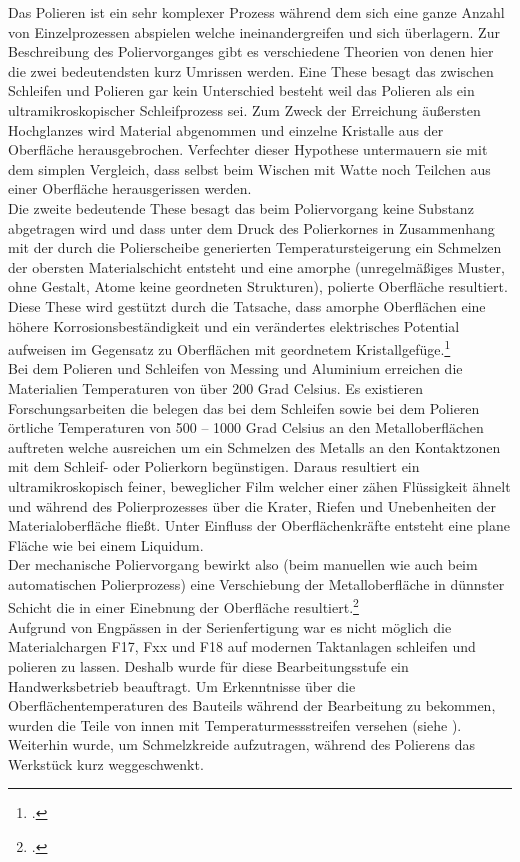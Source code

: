 \documentclass[12pt,a4paper,parskip]{scrartcl}
\begin{document}
Das Polieren ist ein sehr komplexer Prozess während dem sich eine ganze Anzahl von Einzelprozessen abspielen welche ineinandergreifen und sich überlagern. Zur Beschreibung des Poliervorganges gibt es verschiedene Theorien von denen hier die zwei bedeutendsten kurz Umrissen werden. Eine These besagt das zwischen Schleifen und Polieren gar kein Unterschied besteht weil  das Polieren als ein ultramikroskopischer Schleifprozess sei. Zum Zweck der Erreichung  äußersten Hochglanzes wird Material abgenommen und einzelne Kristalle aus der Oberfläche herausgebrochen. Verfechter dieser Hypothese untermauern sie mit dem simplen Vergleich, dass selbst beim Wischen mit Watte noch Teilchen aus einer Oberfläche herausgerissen werden.\\ Die zweite bedeutende These besagt das beim Poliervorgang keine Substanz abgetragen wird und dass unter dem Druck des Polierkornes in Zusammenhang mit der durch die Polierscheibe generierten Temperatursteigerung ein Schmelzen der obersten Materialschicht entsteht und eine amorphe (unregelmäßiges Muster, ohne Gestalt, Atome keine geordneten Strukturen), polierte Oberfläche resultiert. Diese These wird gestützt durch die Tatsache, dass amorphe Oberflächen eine höhere Korrosionsbeständigkeit und ein verändertes elektrisches Potential aufweisen im Gegensatz zu Oberflächen mit geordnetem Kristallgefüge.\footcite[Vgl.][38]{hsp}\\  Bei dem Polieren und Schleifen von Messing und Aluminium erreichen die Materialien Temperaturen von über 200 Grad Celsius. Es existieren Forschungsarbeiten die belegen das bei dem Schleifen sowie bei dem Polieren örtliche Temperaturen von 500 – 1000 Grad Celsius an den Metalloberflächen auftreten welche ausreichen um ein Schmelzen des Metalls an den Kontaktzonen mit dem Schleif- oder Polierkorn begünstigen. Daraus resultiert ein ultramikroskopisch feiner, beweglicher Film welcher  einer zähen Flüssigkeit ähnelt und während des Polierprozesses über die Krater, Riefen und Unebenheiten der Materialoberfläche fließt. Unter Einfluss der Oberflächenkräfte entsteht eine plane Fläche wie bei einem Liquidum.\\ Der mechanische Poliervorgang bewirkt also (beim manuellen wie auch beim automatischen Polierprozess) eine Verschiebung der Metalloberfläche in dünnster Schicht die in einer Einebnung der Oberfläche resultiert.\footcite[Vgl.][40-41]{hsp} \\
Aufgrund von Engpässen in der Serienfertigung war es nicht möglich die Materialchargen F17, Fxx und F18 auf modernen Taktanlagen schleifen und polieren zu lassen. Deshalb wurde für diese Bearbeitungsstufe ein Handwerksbetrieb beauftragt. Um Erkenntnisse über die Oberflächentemperaturen des Bauteils während der Bearbeitung zu bekommen, wurden die Teile von innen mit Temperaturmessstreifen versehen (siehe ). Weiterhin wurde, um Schmelzkreide aufzutragen, während des Polierens das Werkstück kurz weggeschwenkt.
\end{document}
